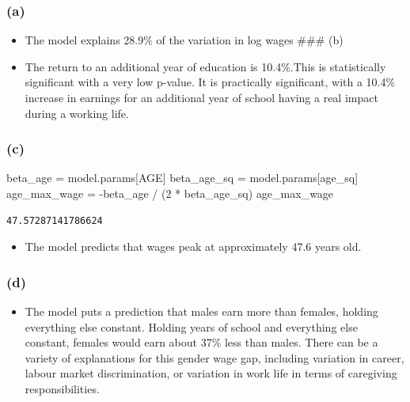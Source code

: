 \documentclass[
  letterpaper,
  DIV=11,
  numbers=noendperiod]{scrartcl}
\newenvironment{Shaded}{\begin{snugshade}}{\end{snugshade}}
\newcommand{\DecValTok}[1]{\textcolor[rgb]{0.68,0.00,0.00}{#1}}
\newcommand{\NormalTok}[1]{\textcolor[rgb]{0.00,0.23,0.31}{#1}}
\newcommand{\OperatorTok}[1]{\textcolor[rgb]{0.37,0.37,0.37}{#1}}
\newcommand{\StringTok}[1]{\textcolor[rgb]{0.13,0.47,0.30}{#1}}
\providecommand{\tightlist}{%
  \setlength{\itemsep}{0pt}\setlength{\parskip}{0pt}}\usepackage{longtable,booktabs,array}
\begin{document}
\subsubsection{(a)}\label{a-1}

\begin{itemize}
\tightlist
\item
  The model explains 28.9\% of the variation in log wages \#\#\# (b)
\item
  The return to an additional year of education is 10.4\%.This is
  statistically significant with a very low p-value. It is practically
  significant, with a 10.4\% increase in earnings for an additional year
  of school having a real impact during a working life.
\end{itemize}

\subsubsection{(c)}\label{c-1}

\begin{Shaded}
\begin{Highlighting}[]
\NormalTok{beta\_age }\OperatorTok{=}\NormalTok{ model.params[}\StringTok{\textquotesingle{}AGE\textquotesingle{}}\NormalTok{]}
\NormalTok{beta\_age\_sq }\OperatorTok{=}\NormalTok{ model.params[}\StringTok{\textquotesingle{}age\_sq\textquotesingle{}}\NormalTok{]}
\NormalTok{age\_max\_wage }\OperatorTok{=} \OperatorTok{{-}}\NormalTok{beta\_age }\OperatorTok{/}\NormalTok{ (}\DecValTok{2} \OperatorTok{*}\NormalTok{ beta\_age\_sq)}
\NormalTok{age\_max\_wage}
\end{Highlighting}
\end{Shaded}

\begin{verbatim}
47.57287141786624
\end{verbatim}

\begin{itemize}
\tightlist
\item
  The model predicts that wages peak at approximately 47.6 years old.
\end{itemize}

\subsubsection{(d)}\label{d-1}

\begin{itemize}
\tightlist
\item
  The model puts a prediction that males earn more than females, holding
  everything else constant. Holding years of school and everything else
  constant, females would earn about 37\% less than males. There can be
  a variety of explanations for this gender wage gap, including
  variation in career, labour market discrimination, or variation in
  work life in terms of caregiving responsibilities.
\end{itemize}
\end{document}
